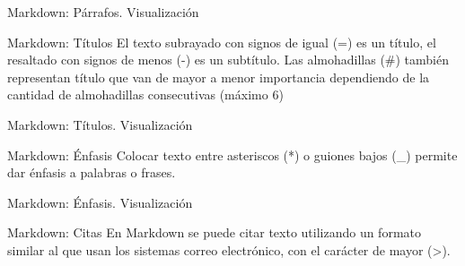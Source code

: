 
\begin{frame}{Markdown: Párrafos. Visualización}
\end{frame}


\begin{frame}{Markdown: Títulos}
  El texto subrayado con signos de igual (=) es un título, el resaltado
  con signos de menos (-) es un subtítulo.
  \jump
  Las almohadillas (\#) también representan título que van de mayor a menor
  importancia dependiendo de la cantidad de almohadillas consecutivas (máximo 6)
\end{frame}


\begin{frame}{Markdown: Títulos. Visualización}
\end{frame}


\begin{frame}{Markdown: Énfasis}
  Colocar texto entre asteriscos (*) o guiones bajos (\_) permite dar énfasis a
  palabras o frases.
  \jump
  \centerline{}
  \centerline{}
  \centerline{}
  \centerline{}
\end{frame}


\begin{frame}{Markdown: Énfasis. Visualización}
\end{frame}


\begin{frame}{Markdown: Citas}
  En Markdown se puede citar texto utilizando un formato similar al que usan los
  sistemas correo electrónico, con el carácter de mayor (>).
\end{frame}

